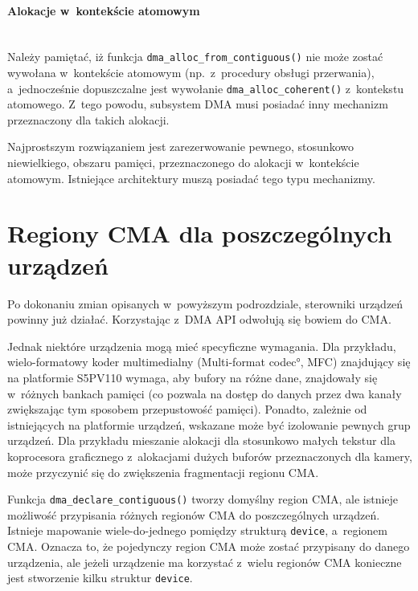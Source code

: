\paragraph{Alokacje w~kontekście atomowym} \hspace{0pt} \\

Należy pamiętać, iż funkcja \lstinline|dma_alloc_from_contiguous()|
nie może zostać wywołana w~kontekście atomowym (np.\ z~procedury
obsługi przerwania), a~jednocześnie dopuszczalne jest wywołanie
\lstinline|dma_alloc_coherent()| z~kontekstu atomowego.  Z~tego
powodu, subsystem DMA musi posiadać inny mechanizm przeznaczony dla
takich alokacji.

Najprostszym rozwiązaniem jest zarezerwowanie pewnego, stosunkowo
niewielkiego, obszaru pamięci, przeznaczonego do alokacji w~kontekście
atomowym.  Istniejące architektury muszą posiadać tego typu
mechanizmy.


\section{Regiony CMA dla poszczególnych urządzeń}\label{sec:priv-regions}

Po dokonaniu zmian opisanych w~powyższym podrozdziale, sterowniki
urządzeń powinny już działać.  Korzystając z~DMA API odwołują się
bowiem do CMA.

Jednak niektóre urządzenia mogą mieć specyficzne wymagania.  Dla
przykładu, wielo-formatowy koder multimedialny (\ang{Multi-format
  codec}, MFC) znajdujący się na platformie S5PV110 wymaga, aby bufory
na różne dane, znajdowały się w~różnych bankach pamięci (co pozwala na
dostęp do danych przez dwa kanały zwiększając tym sposobem
przepustowość pamięci).  Ponadto, zależnie od istniejących na
platformie urządzeń, wskazane może być izolowanie pewnych grup
urządzeń.  Dla przykładu mieszanie alokacji dla stosunkowo małych
tekstur dla koprocesora graficznego z~alokacjami dużych buforów
przeznaczonych dla kamery, może przyczynić się do zwiększenia
fragmentacji regionu CMA.

Funkcja \lstinline|dma_declare_contiguous()| tworzy domyślny region
CMA, ale istnieje możliwość przypisania różnych regionów CMA do
poszczególnych urządzeń.  Istnieje mapowanie wiele-do-jednego pomiędzy
strukturą \lstinline|device|, a~regionem CMA.  Oznacza to, że
pojedynczy region CMA może zostać przypisany do danego urządzenia, ale
jeżeli urządzenie ma korzystać z~wielu regionów CMA konieczne jest
stworzenie kilku struktur \lstinline|device|.

